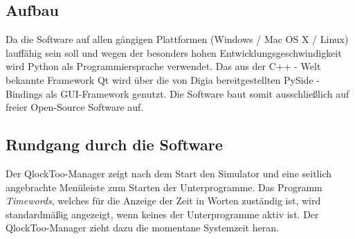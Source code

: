 \subsection{Aufbau}
Da die Software auf allen gängigen Plattformen (Windows / Mac OS X / Linux) lauffähig sein soll und wegen der besonders hohen Entwicklungsgeschwindigkeit wird Python als Programmiersprache verwendet.
Das aus der C++ - Welt bekannte Framework Qt wird über die von Digia bereitgestellten PySide -Bindings als GUI-Framework genutzt. Die Software baut somit ausschließlich auf freier Open-Source Software auf.

\subsection{Rundgang durch die Software}
Der QlockToo-Manager zeigt nach dem Start den Simulator und eine seitlich angebrachte Menüleiste zum Starten der Unterprogramme.
Das Programm \emph{Timewords}, welches für die Anzeige der Zeit in Worten zuständig ist, wird standardmäßig angezeigt, wenn keines der Unterprogramme aktiv ist. Der QlockToo-Manager zieht dazu die momentane Systemzeit heran.

